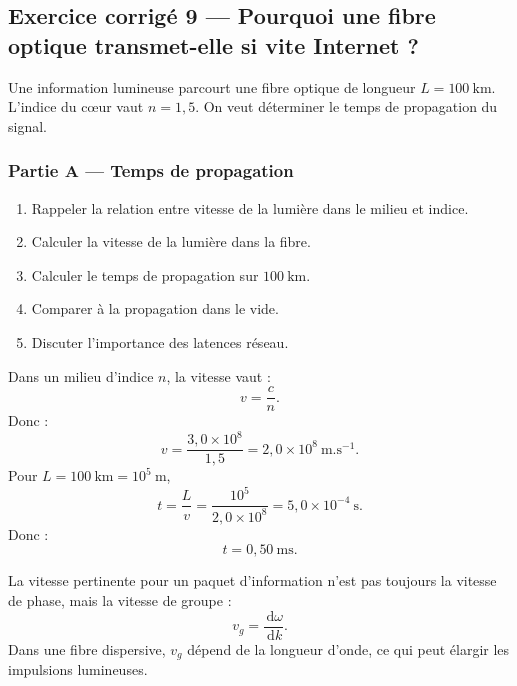 \documentclass[11pt,a4paper]{article}
\newcommand{\dd}{\,\mathrm d}
\begin{document}
\subsection{Exercice corrigé 9 — Pourquoi une fibre optique transmet-elle si vite Internet ?}

\begin{exercicebox}
Une information lumineuse parcourt une fibre optique de longueur \(L=100\ \mathrm{km}\). L'indice du cœur vaut \(n=1{,}5\). On veut déterminer le temps de propagation du signal.
\end{exercicebox}

\subsubsection*{Partie A — Temps de propagation}

\begin{enumerate}
  \item Rappeler la relation entre vitesse de la lumière dans le milieu et indice.
  \item Calculer la vitesse de la lumière dans la fibre.
  \item Calculer le temps de propagation sur \(100\ \mathrm{km}\).
  \item Comparer à la propagation dans le vide.
  \item Discuter l'importance des latences réseau.
\end{enumerate}

\begin{corrigebox}
Dans un milieu d'indice \(n\), la vitesse vaut :
\[
v=\frac{c}{n}.
\]
Donc :
\[
v=\frac{3{,}0\times10^8}{1{,}5}=2{,}0\times10^8\ \mathrm{m.s^{-1}}.
\]
Pour \(L=100\ \mathrm{km}=10^5\ \mathrm m\),
\[
t=\frac{L}{v}
=
\frac{10^5}{2{,}0\times10^8}
=
5{,}0\times10^{-4}\ \mathrm s.
\]
Donc :
\[
t=0{,}50\ \mathrm{ms}.
\]
\end{corrigebox}

\begin{approfondissementbox}
La vitesse pertinente pour un paquet d'information n'est pas toujours la vitesse de phase, mais la vitesse de groupe :
\[
v_g=\frac{\dd\omega}{\dd k}.
\]
Dans une fibre dispersive, \(v_g\) dépend de la longueur d'onde, ce qui peut élargir les impulsions lumineuses.
\end{approfondissementbox}

\end{document}
